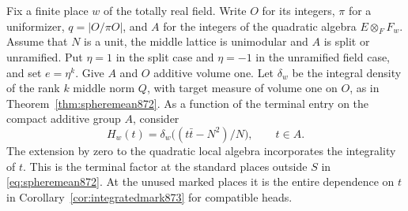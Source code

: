 \documentclass[a4paper,11pt]{article}
\theoremstyle{definition}
\theoremstyle{remark}
\numberwithin{equation}{section}
\begin{document}
Fix a finite place \(w\) of the totally real field. Write \(O\) for
its integers, \(\pi\) for a uniformizer, \(q=|O/\pi O|\), and \(A\)
for the integers of the quadratic algebra \(E\otimes_F F_w\).
Assume that \(N\) is a unit, the middle lattice is unimodular
and \(A\) is split or unramified. Put \(\eta=1\) in the split case
and \(\eta=-1\) in the unramified field case, and set \(e=\eta^k\).
Give \(A\) and \(O\) additive volume one. Let \(\delta_w\) be
the integral density of the rank \(k\) middle norm \(Q\), with
target measure of volume one on \(O\), as in
Theorem~\ref{thm:spheremean872}. As a function of the terminal
entry on the compact additive group \(A\), consider
\[
        H_w(t)=\delta_w\big((t\bar t-N^2)/N\big),\qquad t\in A .
\]
The extension by zero to the quadratic local algebra incorporates
the integrality of \(t\). This is the terminal factor at the
standard places outside \(S\) in \eqref{eq:spheremean872}.
At the unused marked places it is the entire dependence on \(t\)
in Corollary~\ref{cor:integratedmark873} for compatible heads.
\end{document}
